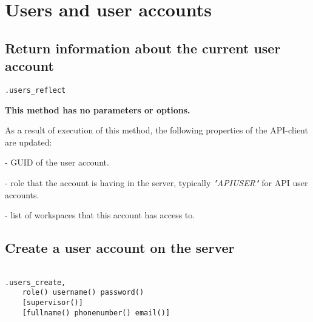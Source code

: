\section{Users and user accounts}

\subsection{Return information about the current user account}
\begin{lstlisting}[style=CommandLineStyle]
.users_reflect
\end{lstlisting}

\textbf{This method has no parameters or options.}

\savedres

As a result of execution of this method, the following properties of the API-client are updated:

\begin{compactitem}
    \item {} - GUID of the user account.
    \item {} - role that the account is having in the server, typically \textit{"APIUSER"} for API user accounts.
    \item {} - list of workspaces that this account has access to.
\end{compactitem}


\subsection{Create a user account on the server}
\begin{lstlisting}[style=CommandLineStyle, showlines=true]

.users_create,
    role() username() password()
    [supervisor()]
    [fullname() phonenumber() email()]

\end{lstlisting}

